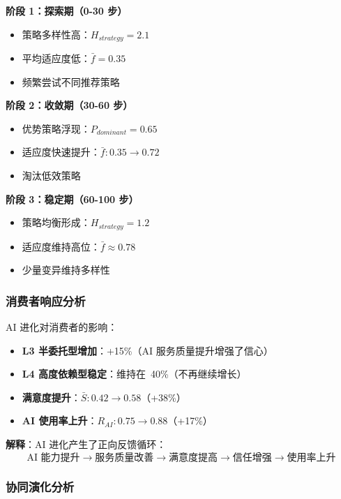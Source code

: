 \documentclass[a4paper,12pt]{article}
\begin{document}
\textbf{阶段 1：探索期（0-30 步）}
\begin{itemize}
    \item 策略多样性高：$H_{strategy} = 2.1$
    \item 平均适应度低：$\bar{f} = 0.35$
    \item 频繁尝试不同推荐策略
\end{itemize}

\textbf{阶段 2：收敛期（30-60 步）}
\begin{itemize}
    \item 优势策略浮现：$P_{dominant} = 0.65$
    \item 适应度快速提升：$\bar{f}: 0.35 \rightarrow 0.72$
    \item 淘汰低效策略
\end{itemize}

\textbf{阶段 3：稳定期（60-100 步）}
\begin{itemize}
    \item 策略均衡形成：$H_{strategy} = 1.2$
    \item 适应度维持高位：$\bar{f} \approx 0.78$
    \item 少量变异维持多样性
\end{itemize}

\subsubsection{消费者响应分析}

AI 进化对消费者的影响：
\begin{itemize}
    \item \textbf{L3 半委托型增加}：+15\%（AI 服务质量提升增强了信心）
    \item \textbf{L4 高度依赖型稳定}：维持在~40\%（不再继续增长）
    \item \textbf{满意度提升}：$\bar{S}: 0.42 \rightarrow 0.58$（+38\%）
    \item \textbf{AI 使用率上升}：$R_{AI}: 0.75 \rightarrow 0.88$（+17\%）
\end{itemize}

\textbf{解释}：AI 进化产生了正向反馈循环：
\begin{equation}
    \text{AI 能力提升} \rightarrow \text{服务质量改善} \rightarrow \text{满意度提高} \rightarrow \text{信任增强} \rightarrow \text{使用率上升}
\end{equation}

\subsubsection{协同演化分析}
\end{document}

